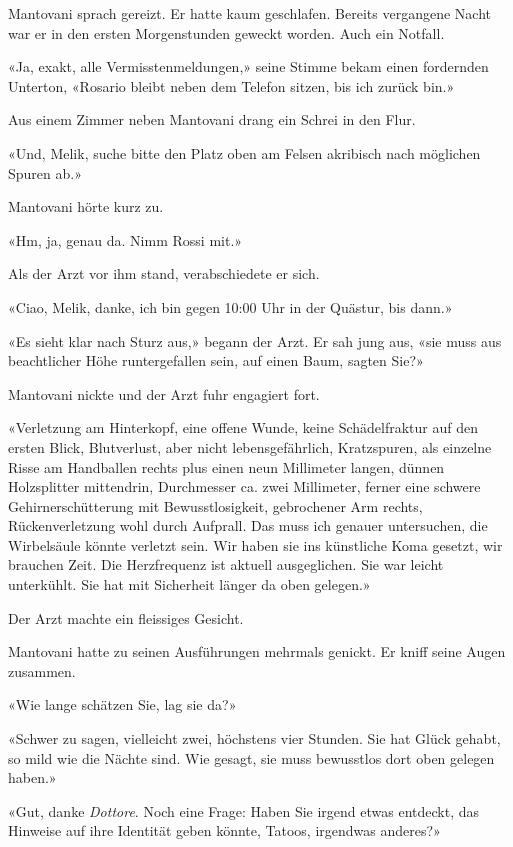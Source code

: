 Mantovani sprach gereizt. Er hatte kaum geschlafen. Bereits vergangene Nacht war er in den ersten Morgenstunden geweckt worden. Auch ein Notfall.

«Ja, exakt, alle Vermisstenmeldungen,» seine Stimme bekam einen fordernden Unterton, «Rosario bleibt neben dem Telefon sitzen, bis ich zurück bin.»

Aus einem Zimmer neben Mantovani drang ein Schrei in den Flur.

«Und, Melik, suche bitte den Platz oben am Felsen akribisch nach möglichen Spuren ab.»

Mantovani hörte kurz zu.

«Hm, ja, genau da. Nimm Rossi mit.»

Als der Arzt vor ihm stand, verabschiedete er sich.

«Ciao, Melik, danke, ich bin gegen 10:00 Uhr in der Quästur, bis dann.»

«Es sieht klar nach Sturz aus,» begann der Arzt. Er sah jung aus, «sie
muss aus beachtlicher Höhe runtergefallen sein, auf einen Baum, sagten
Sie?»

Mantovani nickte und der Arzt fuhr engagiert fort.

«Verletzung am Hinterkopf, eine offene Wunde, keine Schädelfraktur auf
den ersten Blick, Blutverlust, aber nicht lebensgefährlich, Kratzspuren,
als einzelne Risse am Handballen rechts plus einen neun Millimeter
langen, dünnen Holzsplitter mittendrin, Durchmesser ca. zwei Millimeter,
ferner eine schwere Gehirnerschütterung mit Bewusstlosigkeit,
gebrochener Arm rechts, Rückenverletzung wohl durch Aufprall. Das muss
ich genauer untersuchen, die Wirbelsäule könnte verletzt sein. Wir haben
sie ins künstliche Koma gesetzt, wir brauchen Zeit. Die Herzfrequenz ist
aktuell ausgeglichen. Sie war leicht unterkühlt. Sie hat mit Sicherheit
länger da oben gelegen.»

Der Arzt machte ein fleissiges Gesicht.

Mantovani hatte zu seinen Ausführungen mehrmals genickt. Er kniff seine
Augen zusammen.

«Wie lange schätzen Sie, lag sie da?»

«Schwer zu sagen, vielleicht zwei, höchstens vier Stunden. Sie hat Glück
gehabt, so mild wie die Nächte sind. Wie gesagt, sie muss bewusstlos
dort oben gelegen haben.»

«Gut, danke \emph{Dottore}. Noch eine Frage: Haben Sie irgend etwas
entdeckt, das Hinweise auf ihre Identität geben könnte, Tatoos,
irgendwas anderes?»

